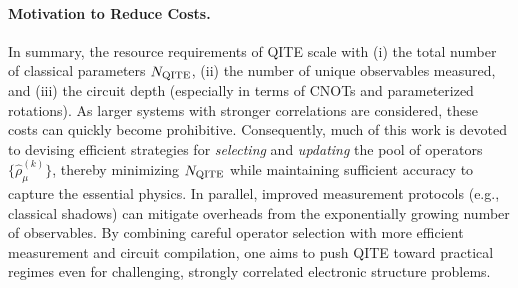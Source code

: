 \documentclass[aip,jcp,amsmath,amssymb, reprint]{revtex4-1}
\begin{document}
\paragraph{Motivation to Reduce Costs.}
In summary, the resource requirements of QITE scale with (i) the total number of classical parameters $N_{\rm{QITE}}$, (ii) the number of unique observables measured, and (iii) the circuit depth (especially in terms of CNOTs and parameterized rotations). As larger systems with stronger correlations are considered, these costs can quickly become prohibitive. Consequently, much of this work is devoted to devising efficient strategies for \textit{selecting} and \textit{updating} the pool of operators $\{\hat{\rho}_\mu^{(k)}\}$, thereby minimizing $N_{\rm{QITE}}$ while maintaining sufficient accuracy to capture the essential physics. In parallel, improved measurement protocols (e.g., classical shadows) can mitigate overheads from the exponentially growing number of observables. By combining careful operator selection with more efficient measurement and circuit compilation, one aims to push QITE toward practical regimes even for challenging, strongly correlated electronic structure problems.
\end{document}
